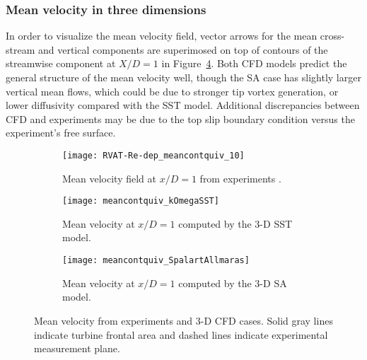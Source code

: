 \subsubsection{Mean velocity in three dimensions}

In order to visualize the mean velocity field, vector arrows for the mean
cross-stream and vertical components are superimosed on top of contours of the
streamwise component at $X/D=1$ in Figure~\ref{fig:br-cfd-mean-velocity}. Both
CFD models predict the general structure of the mean velocity well, though the
SA case has slightly larger vertical mean flows, which could be due to stronger
tip vortex generation, or lower diffusivity compared with the SST model.
Additional discrepancies between CFD and experiments may be due to the top slip
boundary condition versus the experiment's free surface.

\begin{figure}
    \centering
    \begin{subfigure}[b]{\textwidth}
       \centering

        \texttt{[image: RVAT-Re-dep\_meancontquiv\_10]}

       \caption{Mean velocity field at $x/D=1$ from experiments
           \cite{Bachant2016-RVAT-Re-dep}.}

       \label{fig:br-cfd-meancontquiv-exp}
   \end{subfigure}

   \begin{subfigure}[b]{\textwidth}
       \centering

        \texttt{[image: meancontquiv\_kOmegaSST]}

       \caption{Mean velocity at $x/D=1$ computed by the 3-D SST model.}

       \label{fig:meancontquiv-SST}
   \end{subfigure}

   \begin{subfigure}[b]{\textwidth}
       \centering

        \texttt{[image: meancontquiv\_SpalartAllmaras]}

       \caption{Mean velocity at $x/D=1$ computed by the 3-D SA model.}

       \label{fig:meancontquiv-SA}
   \end{subfigure}

    \caption{Mean velocity from experiments and 3-D CFD cases. Solid gray lines
        indicate turbine frontal area and dashed lines indicate experimental
        measurement plane.}

    \label{fig:br-cfd-mean-velocity}
\end{figure}


